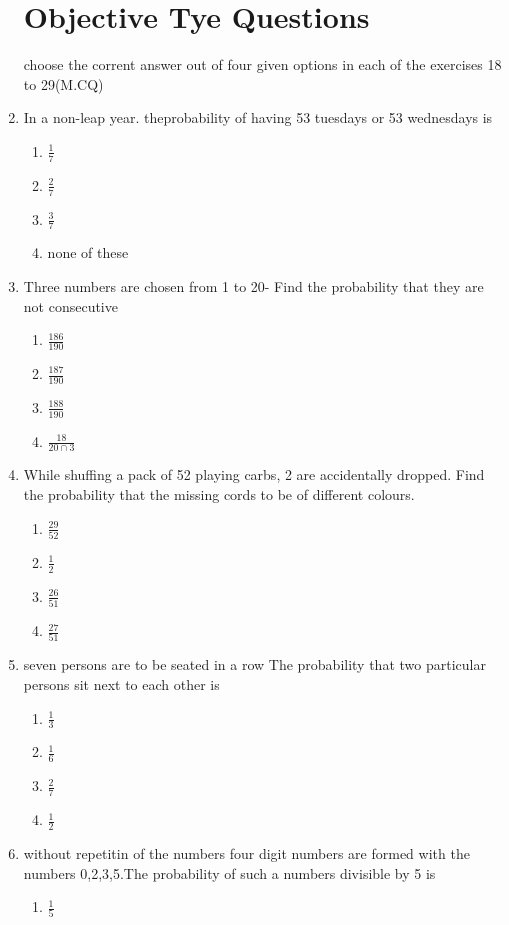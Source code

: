 \documentclass[12pt]{article}
\begin{document}
\begin{enumerate}
\section*{Objective Tye Questions}
choose the corrent answer out of four given options in each of the exercises 18 to 29(M.CQ)
\item In a non-leap year. theprobability of having 53 tuesdays or 53 wednesdays is
\begin{enumerate}
\item $\frac{1}{7}$
\item $\frac{2}{7}$
\item $\frac{3}{7}$
\item none of these
\end{enumerate}
\item Three numbers are chosen from 1 to 20- Find the probability that they are not consecutive
\begin{enumerate}
\item $\frac{186}{190}$
\item $\frac{187}{190}$
\item $\frac{188}{190}$
\item $\frac{18}{20\cap3}$
\end{enumerate}
\item While shuffing a pack of 52 playing carbs, 2 are accidentally dropped. Find the probability that the missing cords to be of different colours.
\begin{enumerate}
\item $\frac{29}{52}$
\item $\frac{1}{2}$
\item $\frac{26}{51}$
\item $\frac{27}{51}$
\end{enumerate}
\item seven persons are to be seated in a row The probability that two particular persons sit next to each other is
\begin{enumerate}
\item $\frac{1}{3}$
\item $\frac{1}{6}$
\item $\frac{2}{7}$
\item $\frac{1}{2}$
\end{enumerate}
\item without repetitin of the numbers four digit numbers are  formed with the numbers 0,2,3,5.The probability of such a numbers divisible by 5 is
\begin{enumerate}
\item $\frac{1}{5}$

\end{enumerate}
\end{enumerate}
\end{document}
